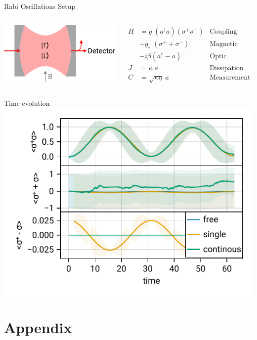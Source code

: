 \documentclass[
]{beamer}
\begin{document}
\begin{frame}{Rabi Oscillations Setup}
	\begin{columns}
		\begin{center}
			\includegraphics{figures/rabi.pdf}
		\end{center}

		\begin{align*}
			H &= g\; (a^\dagger a) (\sigma^+ \sigma^-) &\text{Coupling}\\
			&+ g_s\; (\sigma^+ + \sigma^-) &\text{Magnetic}\\
			&- i \beta (a^\dagger - a) &\text{Optic}\\
			J &= \kappa\; a &\text{Dissipation}\\
			C &= \sqrt{\kappa\eta}\; a &\text{Measurement}
		\end{align*}
		
	\end{columns}

\end{frame}

\begin{frame}{Time evolution}
	\includegraphics{figures/02 rabi w measurement.pdf}
\end{frame}


{
	\begin{frame}[plain]{}\end{frame}
}

\section{Appendix}
% 
\end{document}
